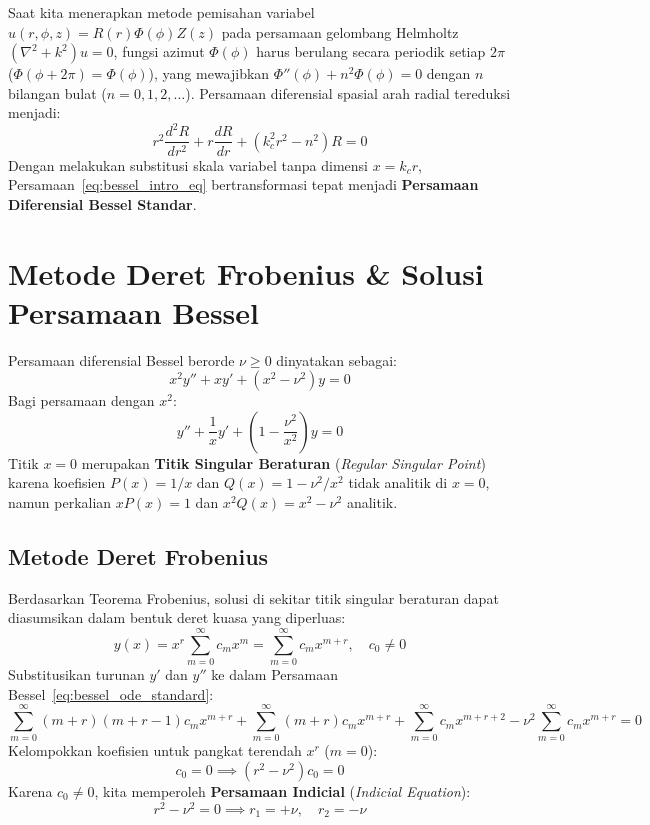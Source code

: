\documentclass[11pt,a4paper]{article}
\theoremstyle{definition}
\begin{document}
Saat kita menerapkan metode pemisahan variabel $u(r, \phi, z) = R(r)\Phi(\phi)Z(z)$ pada persamaan gelombang Helmholtz $(\nabla^2 + k^2)u = 0$, fungsi azimut $\Phi(\phi)$ harus berulang secara periodik setiap $2\pi$ ($\Phi(\phi + 2\pi) = \Phi(\phi)$), yang mewajibkan $\Phi''(\phi) + n^2 \Phi(\phi) = 0$ dengan $n$ bilangan bulat ($n = 0, 1, 2, \dots$). Persamaan diferensial spasial arah radial tereduksi menjadi:
\begin{equation}
    r^2 \frac{d^2 R}{dr^2} + r \frac{dR}{dr} + (k_c^2 r^2 - n^2) R = 0
    \label{eq:bessel_intro_eq}
\end{equation}
Dengan melakukan substitusi skala variabel tanpa dimensi $x = k_c r$, Persamaan~\eqref{eq:bessel_intro_eq} bertransformasi tepat menjadi \textbf{Persamaan Diferensial Bessel Standar}.

\section{Metode Deret Frobenius \& Solusi Persamaan Bessel}

Persamaan diferensial Bessel berorde $\nu \ge 0$ dinyatakan sebagai:
\begin{equation}
    x^2 y'' + x y' + (x^2 - \nu^2) y = 0
    \label{eq:bessel_ode_standard}
\end{equation}
Bagi persamaan dengan $x^2$:
\begin{equation}
    y'' + \frac{1}{x} y' + \left(1 - \frac{\nu^2}{x^2}\right) y = 0
\end{equation}
Titik $x = 0$ merupakan \textbf{Titik Singular Beraturan} (\textit{Regular Singular Point}) karena koefisien $P(x) = 1/x$ dan $Q(x) = 1 - \nu^2/x^2$ tidak analitik di $x = 0$, namun perkalian $x P(x) = 1$ dan $x^2 Q(x) = x^2 - \nu^2$ analitik.

\subsection{Metode Deret Frobenius}
Berdasarkan Teorema Frobenius, solusi di sekitar titik singular beraturan dapat diasumsikan dalam bentuk deret kuasa yang diperluas:
\begin{equation}
    y(x) = x^r \sum_{m=0}^{\infty} c_m x^m = \sum_{m=0}^{\infty} c_m x^{m+r}, \quad c_0 \ne 0
    \label{eq:frobenius_ansatz}
\end{equation}
Substitusikan turunan $y'$ dan $y''$ ke dalam Persamaan Bessel~\eqref{eq:bessel_ode_standard}:
\begin{equation*}
    \sum_{m=0}^{\infty} (m+r)(m+r-1) c_m x^{m+r} + \sum_{m=0}^{\infty} (m+r) c_m x^{m+r} + \sum_{m=0}^{\infty} c_m x^{m+r+2} - \nu^2 \sum_{m=0}^{\infty} c_m x^{m+r} = 0
\end{equation*}
Kelompokkan koefisien untuk pangkat terendah $x^r$ ($m = 0$):
\begin{equation}
    [r(r - 1) + r - \nu^2] c_0 = 0 \implies (r^2 - \nu^2) c_0 = 0
\end{equation}
Karena $c_0 \ne 0$, kita memperoleh \textbf{Persamaan Indicial} (\textit{Indicial Equation}):
\begin{equation}
    r^2 - \nu^2 = 0 \implies r_1 = +\nu, \quad r_2 = -\nu
    \label{eq:indicial_roots}
\end{equation}
\end{document}
